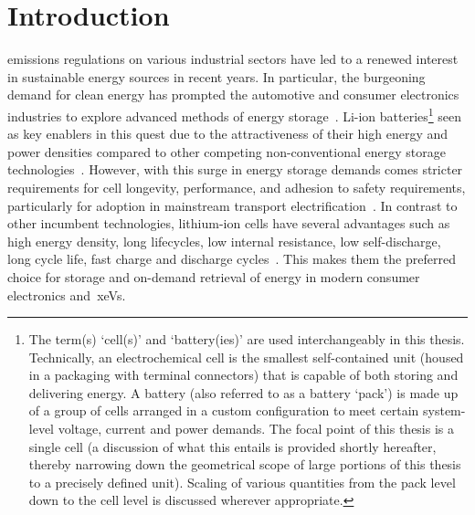
\graphicspath{{chapters/introduction/figures/}}
\chapter{Introduction}\label{ch:intro}


 emissions  regulations on various  industrial sectors
have led  to a renewed interest  in sustainable energy sources  in recent years.
In  particular,  the  burgeoning  demand  for  clean  energy  has  prompted  the
automotive and  consumer electronics industries  to explore advanced  methods of
energy storage~\cite{Weiss2011}. Li-ion batteries\footnote{The term(s) `cell(s)'
and  `battery(ies)'  are  used  interchangeably  in  this  thesis.  Technically,
an  electrochemical  cell is  the  smallest  self-contained  unit (housed  in  a
packaging  with  terminal  connectors)  that  is capable  of  both  storing  and
delivering energy. A battery  (also referred to as a battery  `pack') is made up
of  a  group  of cells  arranged  in  a  custom  configuration to  meet  certain
system-level  voltage,  current and  power  demands.  The  focal point  of  this
thesis  is  a  single cell  (a  discussion  of  what  this entails  is  provided
shortly  hereafter,  thereby  narrowing  down the  geometrical  scope  of  large
portions  of this  thesis  to  a precisely  defined  unit).  Scaling of  various
quantities from  the pack  level down  to the cell  level is  discussed wherever
appropriate.}  seen as  key enablers  in this  quest due  to the  attractiveness
of  their  high   energy  and  power  densities  compared   to  other  competing
non-conventional energy  storage technologies~\cite{Ibrahim2008}.  However, with
this  surge in  energy  storage  demands comes  stricter  requirements for  cell
longevity,  performance,  and  adhesion  to  safety  requirements,  particularly
for  adoption  in  mainstream  transport  electrification~\cite{Andrea2010}.  In
contrast  to  other  incumbent  technologies,  lithium-ion  cells  have  several
advantages  such  as   high  energy  density,  long   lifecycles,  low  internal
resistance,  low self-discharge,  long  cycle life,  fast  charge and  discharge
cycles~\cite{Reddy2011,Plett2015}.  This makes them the
preferred  choice  for storage  and  on-demand  retrieval  of energy  in  modern
consumer electronics and~\glspl{xeV}.

